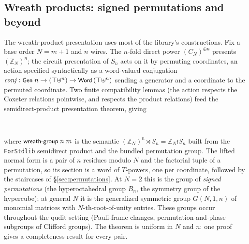 \subsection{Wreath products: signed permutations and beyond}\label{sec:wreath}

The wreath-product presentation uses most of the library's
constructions.  Fix a base order $N = m{+}1$ and $n$ wires.  The $n$-fold
direct power $(C_N)^{\oplus n}$ presents $(\mathbb{Z}_N)^n$; the circuit
presentation of $S_n$ acts on it by permuting coordinates, an action
specified syntactically as a word-valued conjugation
$\mathit{conj} : \mbox{\textsf{\small Gen}}\;n \to (\top \uplus^n) \to
\mbox{\textsf{\small Word}}\,(\top \uplus^n)$ sending a generator and a coordinate to the
permuted coordinate.  Two finite compatibility lemmas (the action
respects the Coxeter relations pointwise, and respects the product
relations) feed the semidirect-product presentation theorem, giving
\begin{code}%
\>[0]\AgdaSpace{}%
\AgdaSymbol{:}\AgdaSpace{}%
\AgdaSpace{}%
\AgdaSpace{}%
\AgdaSpace{}%
%
\>[118I]\AgdaSymbol{(((}\AgdaSpace{}%
\AgdaSpace{}%
\AgdaSymbol{)}\AgdaSpace{}%
\AgdaSpace{}%
\AgdaSymbol{)}\AgdaSpace{}%
\AgdaSpace{}%
\AgdaSymbol{(}\AgdaSpace{}%
\AgdaSymbol{)}\AgdaSpace{}%
\AgdaSpace{}%
\AgdaSpace{}%
\AgdaSymbol{)}\<%
\\
\>[118I][@{}l@{\AgdaIndent{0}}]%
\>[32]\AgdaSpace{}%
\AgdaSymbol{(}\AgdaSpace{}%
\AgdaSpace{}%
\AgdaSymbol{)}\<%
\end{code}
\begin{code}[hide]%
\>[0]\AgdaSpace{}%
\AgdaSpace{}%
\AgdaSpace{}%
\AgdaSymbol{=}\AgdaSpace{}%
\AgdaSpace{}%
\AgdaSpace{}%
\<%
\end{code}
where $\mbox{\textsf{\small wreath-group}}\;n\;m$ is the semantic
$(\mathbb{Z}_N)^n \rtimes S_n = \mathbb{Z}_N \wr S_n$ built from the
\texttt{ForStdlib} semidirect product and the bundled permutation group.
The lifted normal form is a pair of $n$ residues modulo $N$ and the
factorial tuple of a permutation, so its section is a word of $T$-powers,
one per coordinate, followed by the staircases of
\S\ref{sec:permutations}.  At $N = 2$ this is the group of
\emph{signed permutations} (the hyperoctahedral group $B_n$, the
symmetry group of the hypercube); at
general $N$ it is the generalized symmetric group $G(N,1,n)$ of monomial
matrices with $N$-th-root-of-unity entries.  These groups occur throughout
the qudit setting (Pauli-frame changes, permutation-and-phase
subgroups of Clifford groups).  The theorem is uniform in $N$ and $n$:
one proof gives a completeness result for every pair.

